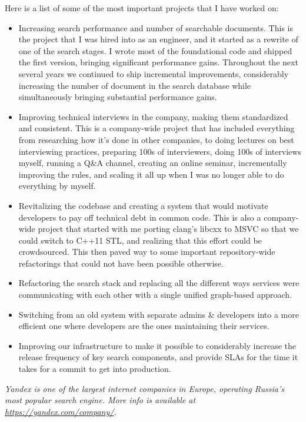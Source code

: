 \documentclass[margin,line]{CV}
\begin{document}
\begin{resume}
    Here is a list of some of the most important projects that I have worked on:
    
    \begin{itemize}
    \item Increasing search performance and number of searchable documents. This is the project that I was hired into as an engineer, and it started as a rewrite of one of the search stages. I wrote most of the foundational code and shipped the first version, bringing significant performance gains. Throughout the next several years we continued to ship incremental improvements, considerably increasing the number of document in the search database while simultaneously bringing substantial performance gains.
    \item Improving technical interviews in the company, making them standardized and consistent. This is a company-wide project that has included everything from researching how it's done in other companies, to doing lectures on best interviewing practices, preparing 100s of interviewers, doing 100s of interviews myself, running a Q\&A channel, creating an online seminar, incrementally improving the rules, and scaling it all up when I was no longer able to do everything by myself. 
    \item Revitalizing the codebase and creating a system that would motivate developers to pay off technical debt in common code. This is also a company-wide project that started with me porting clang's libcxx to MSVC so that we could switch to C++11 STL, and realizing that this effort could be crowdsourced. This then paved way to some important repository-wide refactorings that could not have been possible otherwise.
    \item Refactoring the search stack and replacing all the different ways services were communicating with each other with a single unified graph-based approach.
    \item Switching from an old system with separate admins \& developers into a more efficient one where developers are the ones maintaining their services.
    \item Improving our infrastructure to make it possible to considerably increase the release frequency of key search components, and provide SLAs for the time it takes for a commit to get into production.
    \end{itemize}

\ifdefined\superofficial
    {\footnotesize\textit{Yandex is one of the largest internet companies in Europe, operating Russia's most popular search engine. More info is available at \url{https://yandex.com/company/}.}}
\fi 


\end{resume}
\end{document}

